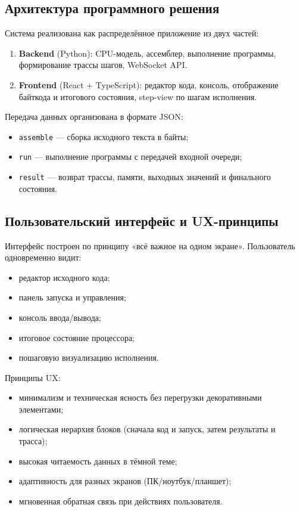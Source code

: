 \documentclass[12pt,a4paper]{article}
\begin{document}
\subsection{Архитектура программного решения}
Система реализована как распределённое приложение из двух частей:
\begin{enumerate}
  \item \textbf{Backend} (Python): CPU-модель, ассемблер, выполнение программы, формирование трассы шагов, WebSocket API.
  \item \textbf{Frontend} (React + TypeScript): редактор кода, консоль, отображение байткода и итогового состояния, step-view по шагам исполнения.
\end{enumerate}

Передача данных организована в формате JSON:
\begin{itemize}
  \item \texttt{assemble} --- сборка исходного текста в байты;
  \item \texttt{run} --- выполнение программы с передачей входной очереди;
  \item \texttt{result} --- возврат трассы, памяти, выходных значений и финального состояния.
\end{itemize}

\subsection{Пользовательский интерфейс и UX-принципы}
Интерфейс построен по принципу «всё важное на одном экране». Пользователь одновременно видит:
\begin{itemize}
  \item редактор исходного кода;
  \item панель запуска и управления;
  \item консоль ввода/вывода;
  \item итоговое состояние процессора;
  \item пошаговую визуализацию исполнения.
\end{itemize}

Принципы UX:
\begin{itemize}
  \item минимализм и техническая ясность без перегрузки декоративными элементами;
  \item логическая иерархия блоков (сначала код и запуск, затем результаты и трасса);
  \item высокая читаемость данных в тёмной теме;
  \item адаптивность для разных экранов (ПК/ноутбук/планшет);
  \item мгновенная обратная связь при действиях пользователя.
\end{itemize}
\end{document}
